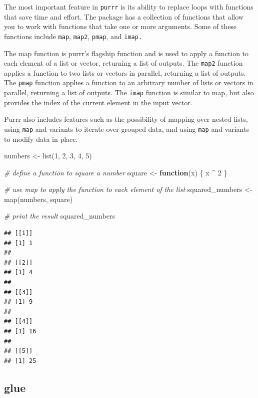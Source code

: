 \documentclass[
]{book}
\newenvironment{Shaded}{\begin{snugshade}}{\end{snugshade}}
\newcommand{\CommentTok}[1]{\textcolor[rgb]{0.56,0.35,0.01}{\textit{#1}}}
\newcommand{\ControlFlowTok}[1]{\textcolor[rgb]{0.13,0.29,0.53}{\textbf{#1}}}
\newcommand{\DecValTok}[1]{\textcolor[rgb]{0.00,0.00,0.81}{#1}}
\newcommand{\FunctionTok}[1]{\textcolor[rgb]{0.00,0.00,0.00}{#1}}
\newcommand{\NormalTok}[1]{#1}
\newcommand{\OtherTok}[1]{\textcolor[rgb]{0.56,0.35,0.01}{#1}}
\newcommand{\SpecialCharTok}[1]{\textcolor[rgb]{0.00,0.00,0.00}{#1}}
\begin{document}
The most important feature in \texttt{purrr} is its ability to replace loops with functions that save time and effort. The package has a collection of functions that allow you to work with functions that take one or more arguments. Some of these functions include \texttt{map}, \texttt{map2}, \texttt{pmap}, and \texttt{imap.}

The map function is purrr's flagship function and is used to apply a function to each element of a list or vector, returning a list of outputs. The \texttt{map2} function applies a function to two lists or vectors in parallel, returning a list of outputs. The \texttt{pmap} function applies a function to an arbitrary number of lists or vectors in parallel, returning a list of outputs. The \texttt{imap} function is similar to map, but also provides the index of the current element in the input vector.

Purrr also includes features such as the possibility of mapping over nested lists, using \texttt{map} and variants to iterate over grouped data, and using \texttt{map} and variants to modify data in place.

\begin{Shaded}
\begin{Highlighting}[]
\NormalTok{numbers }\OtherTok{\textless{}{-}} \FunctionTok{list}\NormalTok{(}\DecValTok{1}\NormalTok{, }\DecValTok{2}\NormalTok{, }\DecValTok{3}\NormalTok{, }\DecValTok{4}\NormalTok{, }\DecValTok{5}\NormalTok{)}

\CommentTok{\# define a function to square a number}
\NormalTok{square }\OtherTok{\textless{}{-}} \ControlFlowTok{function}\NormalTok{(x) \{ x }\SpecialCharTok{\^{}} \DecValTok{2}\NormalTok{ \}}

\CommentTok{\# use map to apply the function to each element of the list}
\NormalTok{squared\_numbers }\OtherTok{\textless{}{-}} \FunctionTok{map}\NormalTok{(numbers, square)}

\CommentTok{\# print the result}
\NormalTok{squared\_numbers}
\end{Highlighting}
\end{Shaded}

\begin{verbatim}
## [[1]]
## [1] 1
## 
## [[2]]
## [1] 4
## 
## [[3]]
## [1] 9
## 
## [[4]]
## [1] 16
## 
## [[5]]
## [1] 25
\end{verbatim}

\hypertarget{glue}{%
\subsection*{glue}\label{glue}}
\end{document}
